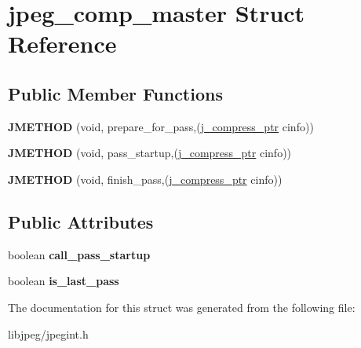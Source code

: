 \hypertarget{structjpeg__comp__master}{\section{jpeg\-\_\-comp\-\_\-master Struct Reference}
\label{structjpeg__comp__master}
}
\subsection*{Public Member Functions}
\begin{DoxyCompactItemize}
\item 
\hypertarget{structjpeg__comp__master_afdbee5aedaedd9c6c9837b6bfd834a63}{{\bfseries J\-M\-E\-T\-H\-O\-D} (void, prepare\-\_\-for\-\_\-pass,(\hyperlink{structjpeg__compress__struct}{j\-\_\-compress\-\_\-ptr} cinfo))}\label{structjpeg__comp__master_afdbee5aedaedd9c6c9837b6bfd834a63}

\item 
\hypertarget{structjpeg__comp__master_ac7e4391d1afe92c685cb4ffea5383d2c}{{\bfseries J\-M\-E\-T\-H\-O\-D} (void, pass\-\_\-startup,(\hyperlink{structjpeg__compress__struct}{j\-\_\-compress\-\_\-ptr} cinfo))}\label{structjpeg__comp__master_ac7e4391d1afe92c685cb4ffea5383d2c}

\item 
\hypertarget{structjpeg__comp__master_a81648a22581acb403aa707a5e56bf993}{{\bfseries J\-M\-E\-T\-H\-O\-D} (void, finish\-\_\-pass,(\hyperlink{structjpeg__compress__struct}{j\-\_\-compress\-\_\-ptr} cinfo))}\label{structjpeg__comp__master_a81648a22581acb403aa707a5e56bf993}

\end{DoxyCompactItemize}
\subsection*{Public Attributes}
\begin{DoxyCompactItemize}
\item 
\hypertarget{structjpeg__comp__master_a72c70556604030b6b10d798f6c193e6f}{boolean {\bfseries call\-\_\-pass\-\_\-startup}}\label{structjpeg__comp__master_a72c70556604030b6b10d798f6c193e6f}

\item 
\hypertarget{structjpeg__comp__master_aac35b3d9e718376d1aacdde9df32e75d}{boolean {\bfseries is\-\_\-last\-\_\-pass}}\label{structjpeg__comp__master_aac35b3d9e718376d1aacdde9df32e75d}

\end{DoxyCompactItemize}


The documentation for this struct was generated from the following file\-:\begin{DoxyCompactItemize}
\item 
libjpeg/jpegint.\-h\end{DoxyCompactItemize}
